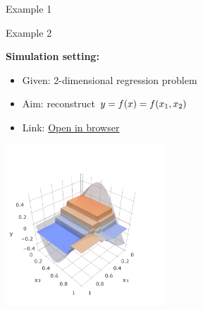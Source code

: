 \begin{frame}{Example 1}
\begin{center}
\end{center}

\end{frame}

\begin{vbframe}{Example 2}

\textbf{Simulation setting:}
\begin{itemize}
  \item Given: 2-dimensional regression problem
  \item Aim: reconstruct $ y = f(x) = f (x_1, x_2) $
  \item Link: \href{http://arogozhnikov.github.io/2016/06/24/gradient_boosting_explained.html}{Open in browser}
\end{itemize}

\begin{center}
\includegraphics[width=0.45\textwidth]{figure_man/gbm_anim/gbm_tree_anim_depth_2_target_3.png}
\end{center}



\end{vbframe}


